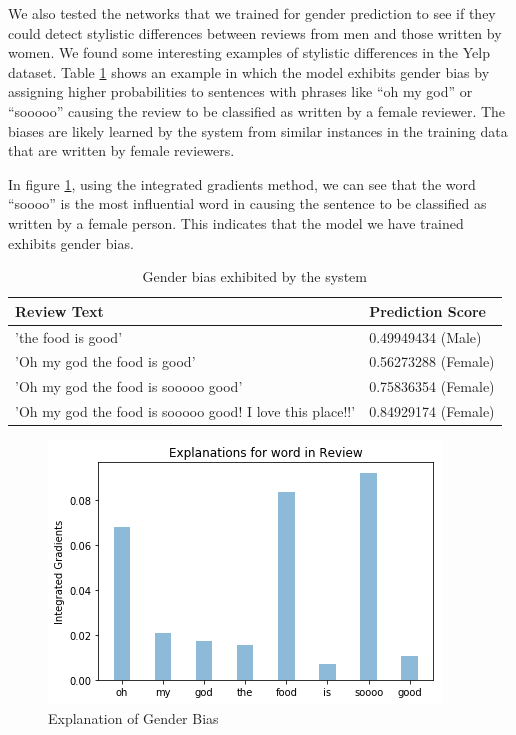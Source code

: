 We also tested the networks that we trained for gender prediction to see if they could detect stylistic differences between reviews from men and those written by women. We found some interesting examples of stylistic differences in the Yelp dataset. Table \ref{table:bias} shows an example in which the model exhibits gender bias by assigning higher probabilities to sentences with phrases like ``oh my god'' or ``sooooo'' causing the review to be classified as written by a female reviewer. The biases are likely learned by the system from similar instances in the training data that are written by female reviewers.

In figure \ref{fig:bias}, using the integrated gradients method, we can see that the word ``soooo'' is the most influential word in causing the sentence to be classified as written by a female person. This indicates that the model we have trained exhibits gender bias.

\begin{table}
    \centering
    \begin{tabular}{|l|l|}
    \hline
    Review Text & Prediction Score  \\
    \hline
    'the food is good' & 0.49949434 (Male)  \\
    \hline
    'Oh my god the food is good' & 0.56273288 (Female)    \\
    \hline
    'Oh my god the food is sooooo good' & 0.75836354 (Female) \\
    \hline
    'Oh my god the food is sooooo good! I love this place!!' & 0.84929174 (Female)   \\
    \hline
    \end{tabular}
    \caption{Gender bias exhibited by the system}
    \label{table:bias}
\end{table}

\begin{figure}
	\includegraphics[width=\textwidth]{figure10}
	\caption{Explanation of Gender Bias}
	\label{fig:bias}
\end{figure}

